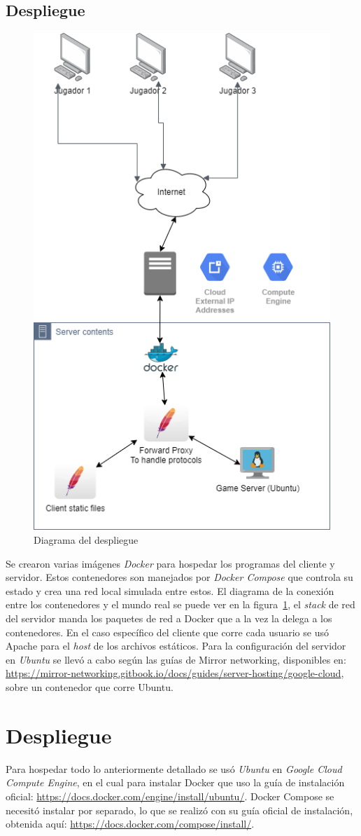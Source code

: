 \subsection{Despliegue}
\begin{figure}[H]
    \centering
    \includegraphics[width=0.5\linewidth]{images/diagrama_deployment.png}
    \caption{Diagrama del despliegue}
    \label{fig:diagrama_despliege}
\end{figure}
Se crearon varias imágenes \textit{Docker} para hospedar los programas del cliente y servidor. Estos contenedores son manejados por \textit{Docker Compose} que controla su estado y crea una red local simulada entre estos. El diagrama de la conexión entre los contenedores y el mundo real se puede ver en la figura~\ref{fig:diagrama_despliege}, el \textit{stack} de red del servidor manda los paquetes de red a Docker que a la vez la delega a los contenedores.
En el caso específico del cliente que corre cada usuario se usó Apache para el \textit{host} de los archivos estáticos.
Para la configuración del servidor en \textit{Ubuntu} se llevó a cabo según las guías de Mirror networking, disponibles en: \url{https://mirror-networking.gitbook.io/docs/guides/server-hosting/google-cloud}, sobre un contenedor que corre Ubuntu.

\section{Despliegue}
Para hospedar todo lo anteriormente detallado se usó \textit{Ubuntu} en \textit{Google Cloud Compute Engine}, en el cual para instalar Docker que uso la guía de instalación oficial: \url{https://docs.docker.com/engine/install/ubuntu/}. Docker Compose se necesitó instalar por separado, lo que se realizó con su guía oficial de instalación, obtenida aquí: \url{https://docs.docker.com/compose/install/}.

